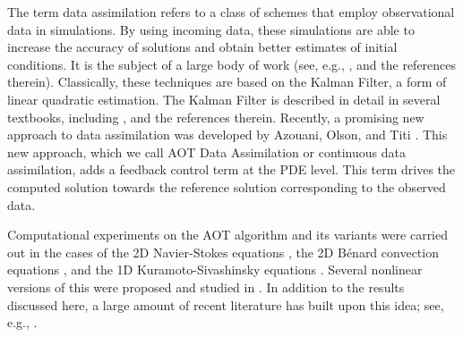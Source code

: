 \documentclass[12pt]{amsart}
\theoremstyle{plain}
\theoremstyle{definition}
\theoremstyle{remark}
\numberwithin{equation}{section} %
\numberwithin{figure}{section}   %
\begin{document}
The term data assimilation refers to a class of schemes that employ observational data in simulations. By using incoming data, these simulations are able to increase the accuracy of solutions and obtain better estimates of initial conditions.
It is the subject of a large body of work (see, e.g., \cite{Daley_1993_atmospheric_book,Kalnay_2003_DA_book,Law_Stuart_Zygalakis_2015_book}, and the references therein).  
Classically, these techniques are based on the Kalman Filter, a form of linear quadratic estimation.  The Kalman Filter is described in detail in several textbooks, including \cite{Daley_1993_atmospheric_book,Kalnay_2003_DA_book,Law_Stuart_Zygalakis_2015_book,CHJ69}, and the references therein.  Recently, a promising new approach to data assimilation was  developed by Azouani, Olson, and Titi \cite{Azouani_Olson_Titi_2014,Azouani_Titi_2014}. 
This new approach, which we call AOT Data Assimilation or continuous data assimilation, adds a feedback control term at the PDE level. This term drives the computed solution towards the reference solution corresponding to the observed data. 

Computational experiments on the AOT algorithm and its variants were carried out in the cases of the 2D Navier-Stokes equations \cite{Gesho_Olson_Titi_2015}, the 2D B\'enard convection equations \cite{Altaf_Titi_Knio_Zhao_Mc_Cabe_Hoteit_2015}, and the 1D Kuramoto-Sivashinsky equations \cite{Lunasin_Titi_2015,Larios_Pei_2017_KSE_DA_NL}. Several nonlinear versions of this were proposed and studied in \cite{Larios_Pei_2017_KSE_DA_NL}. In addition to the results discussed here, a large amount of recent literature has built upon this idea; see, e.g., \cite{Albanez_Nussenzveig_Lopes_Titi_2016,Biswas_Martinez_2017,Farhat_Jolly_Titi_2015,Farhat_Lunasin_Titi_2016abridged,Farhat_Lunasin_Titi_2016benard,Farhat_Lunasin_Titi_2016_Charney,Farhat_Lunasin_Titi_2017_Horizontal,Foyash_Dzholli_Kravchenko_Titi_2014,Jolly_Martinez_Titi_2017,Jolly_Sadigov_Titi_2015,Markowich_Titi_Trabelsi_2016,Mondaini_Titi_2017,Mondaini_Titi_2018_SIAM_NA}.
\end{document}
